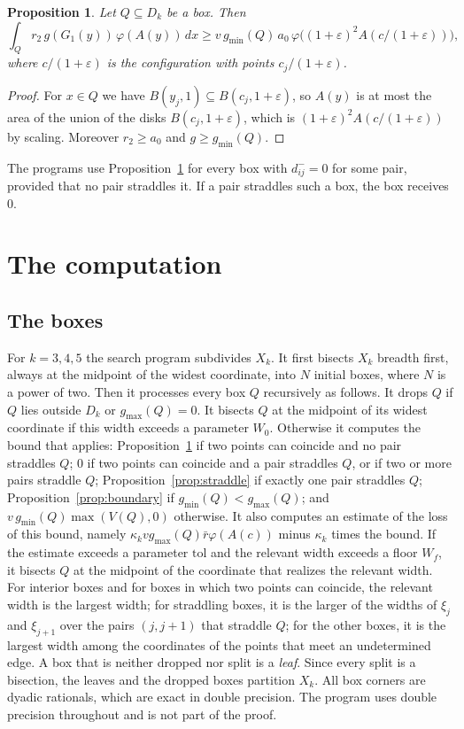 \documentclass[11pt]{amsart}
\newtheorem{proposition}[theorem]{Proposition}
\theoremstyle{definition}
\theoremstyle{remark}
\numberwithin{equation}{section}
\newcommand{\gmin}{g_{\min}}
\newcommand{\gmax}{g_{\max}}
\begin{document}
\begin{proposition}\label{prop:coincident}
Let $Q\subseteq D_k$ be a box. Then
\[
\int_Qr_2\,g(G_1(y))\,\varphi(A(y))\,dx\ge v\,\gmin(Q)\,a_0\,\varphi\bigl((1+\varepsilon)^2A(c/(1+\varepsilon))\bigr),
\]
where $c/(1+\varepsilon)$ is the configuration with points $c_j/(1+\varepsilon)$.
\end{proposition}

\begin{proof}
For $x\in Q$ we have $B(y_j,1)\subseteq B(c_j,1+\varepsilon)$, so $A(y)$ is at most the area of the union of the disks $B(c_j,1+\varepsilon)$, which is $(1+\varepsilon)^2A(c/(1+\varepsilon))$ by scaling. Moreover $r_2\ge a_0$ and $g\ge\gmin(Q)$.
\end{proof}

The programs use Proposition~\ref{prop:coincident} for every box with $d^-_{ij}=0$ for some pair, provided that no pair straddles it. If a pair straddles such a box, the box receives $0$.

\section{The computation}\label{sec:cert}

\subsection{The boxes}\label{sec:search}
For $k=3,4,5$ the search program subdivides $X_k$. It first bisects $X_k$ breadth first, always at the midpoint of the widest coordinate, into $N$ initial boxes, where $N$ is a power of two. Then it processes every box $Q$ recursively as follows. It drops $Q$ if $Q$ lies outside $D_k$ or $\gmax(Q)=0$. It bisects $Q$ at the midpoint of its widest coordinate if this width exceeds a parameter $W_0$. Otherwise it computes the bound that applies: Proposition~\ref{prop:coincident} if two points can coincide and no pair straddles $Q$; $0$ if two points can coincide and a pair straddles $Q$, or if two or more pairs straddle $Q$; Proposition~\ref{prop:straddle} if exactly one pair straddles $Q$; Proposition~\ref{prop:boundary} if $\gmin(Q)<\gmax(Q)$; and $v\,\gmin(Q)\max(V(Q),0)$ otherwise. It also computes an estimate of the loss of this bound, namely $\kappa_kv\gmax(Q)\bar r\varphi(A(c))$ minus $\kappa_k$ times the bound. If the estimate exceeds a parameter $\mathrm{tol}$ and the relevant width exceeds a floor $W_f$, it bisects $Q$ at the midpoint of the coordinate that realizes the relevant width. For interior boxes and for boxes in which two points can coincide, the relevant width is the largest width; for straddling boxes, it is the larger of the widths of $\xi_j$ and $\xi_{j+1}$ over the pairs $(j,j+1)$ that straddle $Q$; for the other boxes, it is the largest width among the coordinates of the points that meet an undetermined edge. A box that is neither dropped nor split is a \emph{leaf}. Since every split is a bisection, the leaves and the dropped boxes partition $X_k$. All box corners are dyadic rationals, which are exact in double precision. The program uses double precision throughout and is not part of the proof.
\end{document}
